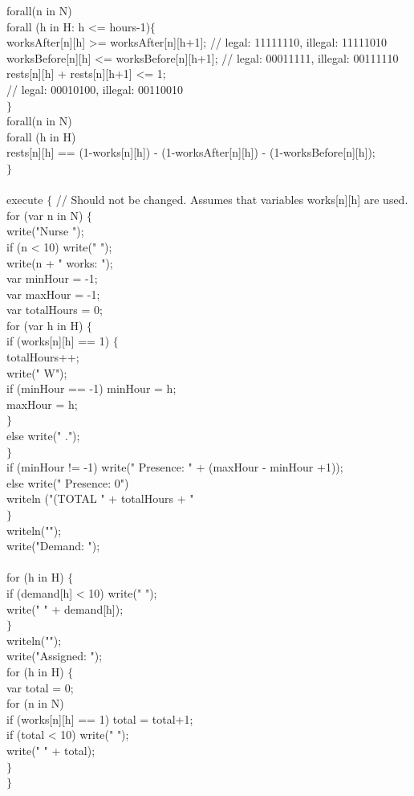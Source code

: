 \documentclass[11pt]{article}
\begin{document}
{\begin{appendix}
{forall(n in N)\\
forall (h in H: h <= hours-1)$\{$\\
worksAfter[n][h] >= worksAfter[n][h+1]; // legal: 11111110, illegal: 11111010\\
worksBefore[n][h] <= worksBefore[n][h+1]; // legal: 00011111, illegal: 00111110\\
rests[n][h] + rests[n][h+1] <= 1;\\
// legal: 00010100, illegal: 00110010\\
$\}$\\
forall(n in N)\\
forall (h in H)\\
rests[n][h] == (1-works[n][h]) - (1-worksAfter[n][h]) - (1-worksBefore[n][h]); \\
$\}$ \\
\\
execute $\{$ // Should not be changed. Assumes that variables works[n][h] are used.\\
for (var n in N) $\{$\\
write("Nurse ");\\
if (n < 10) write(" ");\\
write(n + " works: ");\\
var minHour = -1;\\
var maxHour = -1;\\
var totalHours = 0;\\
for (var h in H) $\{$\\
if (works[n][h] == 1) $\{$\\
totalHours++;\\
write(" W"); \\
if (minHour == -1) minHour = h;\\
maxHour = h; \\
$\}$\\
else write(" .");\\
$\}$\\
if (minHour != -1) write(" Presence: " + (maxHour - minHour +1));\\
else write(" Presence: 0")\\
writeln ("(TOTAL " + totalHours + "\\
$\}$\\
writeln("");\\
write("Demand: ");\\
\\
for (h in H) $\{$\\
if (demand[h] < 10) write(" ");\\
write(" " + demand[h]); \\
$\}$\\
writeln("");\\
write("Assigned: ");\\
for (h in H) $\{$\\
var total = 0;\\
for (n in N)\\
if (works[n][h] == 1) total = total+1;\\
if (total < 10) write(" ");\\
write(" " + total); \\
$\}$ \\
$\}$\\
}


\end{appendix}}
\end{document}
